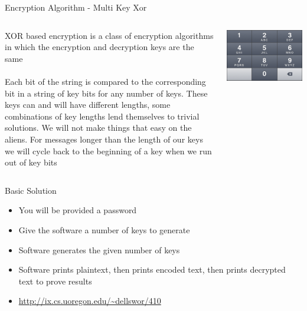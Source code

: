 \documentclass[xcolor=dvipsnames]{beamer}
\begin{document}
  \begin{frame}{Encryption Algorithm - Multi Key Xor}
		\begin{columns}
			\begin{column}{0.5\textwidth}
          XOR based encryption is a class of encryption algorithms in which the encryption
          and decryption keys are the same
					\\~\\
			    Each bit of the string is compared to the corresponding bit in a string of key
          bits for any number of keys. These keys can and will have different lengths,
          some combinations of key lengths lend themselves to trivial solutions. We will
          not make things that easy on the aliens. For messages longer than the length of
          our keys we will cycle back to the beginning of a key when we run out of key bits
      \end{column}
			\begin{column}{0.5\textwidth}
				\includegraphics[width=\textwidth]{images/keypad}
			\end{column}
		\end{columns}
	\end{frame}
	
	\begin{frame}{Basic Solution}
		\begin{itemize}
			\item You will be provided a password
			\item Give the software a number of keys to generate
			\item Software generates the given number of keys
			\item Software prints plaintext, then prints encoded text, then prints decrypted text to prove results
			\item \href{http://ix.cs.uoregon.edu/~dellswor/410}{\url{http://ix.cs.uoregon.edu/~dellswor/410}}
		\end{itemize}
	\end{frame}
	
\end{document}
